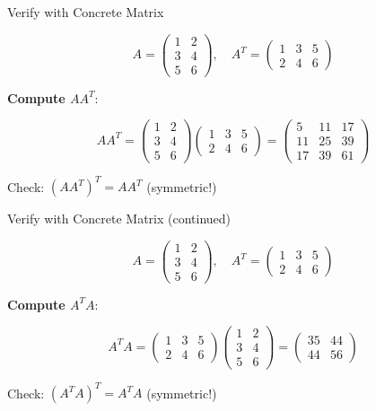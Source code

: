 \documentclass[10pt]{beamer}
\theoremstyle{definition}
\newcommand{\x}[1]{\alert{\textbf{#1}}}
\begin{document}
\begin{frame}{Verify with Concrete Matrix}

$$A = \begin{pmatrix} 1 & 2 \\ 3 & 4 \\ 5 & 6 \end{pmatrix}, \quad A^T = \begin{pmatrix} 1 & 3 & 5 \\ 2 & 4 & 6 \end{pmatrix}$$

\vspace{1em}

\x{Compute $AA^T$}:

$$AA^T = \begin{pmatrix} 1 & 2 \\ 3 & 4 \\ 5 & 6 \end{pmatrix} \begin{pmatrix} 1 & 3 & 5 \\ 2 & 4 & 6 \end{pmatrix} = \begin{pmatrix} 5 & 11 & 17 \\ 11 & 25 & 39 \\ 17 & 39 & 61 \end{pmatrix}$$

Check: $(AA^T)^T = AA^T$ \checkmark \quad (symmetric!)

\end{frame}

\begin{frame}{Verify with Concrete Matrix (continued)}

$$A = \begin{pmatrix} 1 & 2 \\ 3 & 4 \\ 5 & 6 \end{pmatrix}, \quad A^T = \begin{pmatrix} 1 & 3 & 5 \\ 2 & 4 & 6 \end{pmatrix}$$

\vspace{1em}

\x{Compute $A^T A$}:

$$A^T A = \begin{pmatrix} 1 & 3 & 5 \\ 2 & 4 & 6 \end{pmatrix} \begin{pmatrix} 1 & 2 \\ 3 & 4 \\ 5 & 6 \end{pmatrix} = \begin{pmatrix} 35 & 44 \\ 44 & 56 \end{pmatrix}$$

Check: $(A^T A)^T = A^T A$ \checkmark \quad (symmetric!)

\end{frame}
\end{document}
